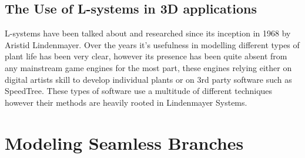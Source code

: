 \FloatBarrier

\subsection{The Use of L-systems in 3D applications}

\begin{flushleft}

L-systems have been talked about and researched since its inception in 1968 by Aristid Lindenmayer. Over the years it's usefulness in modelling different types of plant life has been very clear, however its presence has been quite absent from any mainstream game engines for the most part, these engines relying either on digital artists skill to develop individual plants or on 3rd party software such as SpeedTree. These types of software use a multitude of different techniques however their methods are heavily rooted in Lindenmayer Systems. 

\end{flushleft}

\newpage

\section{Modeling Seamless Branches}

